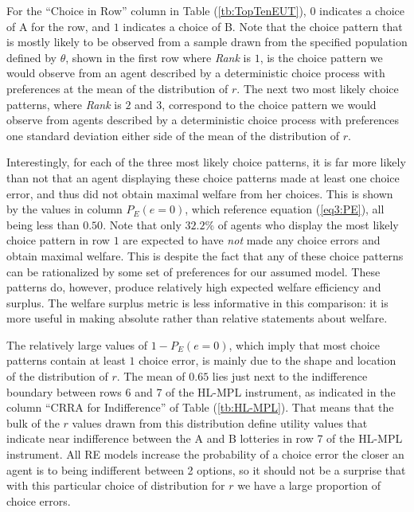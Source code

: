 \documentclass[../main.tex]{subfiles}
\begin{document}
For the \enquote{Choice in Row} column in Table (\ref{tb:TopTenEUT}), $0$ indicates a choice of A for the row, and $1$ indicates a choice of B.
Note that the choice pattern that is mostly likely to be observed from a sample drawn from the specified population defined by $\theta$, shown in the first row where \textit{Rank} is $1$, is the choice pattern we would observe from an agent described by a deterministic choice process with preferences at the mean of the distribution of $r$.
The next two most likely choice patterns, where \textit{Rank} is $2$ and $3$, correspond to the choice pattern we would observe from agents described by a deterministic choice process with preferences one standard deviation either side of the mean of the distribution of $r$.

Interestingly, for each of the three most likely choice patterns, it is far more likely than not that an agent displaying these choice patterns made at least one choice error, and thus did not obtain maximal welfare from her choices.
This is shown by the values in column $P_E(e=0)$, which reference equation (\ref{eq3:PE}), all being less than $0.50$.
Note that only $32.2\%$ of agents who display the most likely choice pattern in row $1$ are expected to have \textit{not} made any choice errors and obtain maximal welfare.
This is despite the fact that any of these choice patterns can be rationalized by some set of preferences for our assumed model.
These patterns do, however, produce relatively high expected welfare efficiency and surplus.
The welfare surplus metric is less informative in this comparison: it is more useful in making absolute rather than relative statements about welfare.

The relatively large values of $ 1 - P_E(e = 0)$, which imply that most choice patterns contain at least $1$ choice error, is mainly due to the shape and location of the distribution of $r$.
The mean of $0.65$ lies just next to the indifference boundary between rows 6 and 7 of the HL-MPL instrument, as indicated in the column \enquote{CRRA for Indifference} of Table (\ref{tb:HL-MPL}).
That means that the bulk of the $r$ values drawn from this distribution define utility values that indicate near indifference between the A and B lotteries in row 7 of the HL-MPL instrument.
All RE models increase the probability of a choice error the closer an agent is to being indifferent between 2 options, so it should not be a surprise that with this particular choice of distribution for $r$ we have a large proportion of choice errors.
\end{document}
